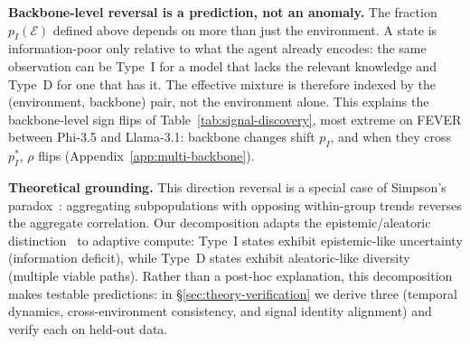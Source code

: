 \textbf{Backbone-level reversal is a prediction, not an anomaly.}
The fraction $p_I(\mathcal{E})$ defined above depends on more than just the environment. A state is information-poor only relative to what the agent already encodes: the same observation can be Type~I for a model that lacks the relevant knowledge and Type~D for one that has it. The effective mixture is therefore indexed by the (environment, backbone) pair, not the environment alone. This explains the backbone-level sign flips of Table~\ref{tab:signal-discovery}, most extreme on FEVER between Phi-3.5 and Llama-3.1: backbone changes shift $p_I$, and when they cross $p_I^*$, $\rho$ flips (Appendix~\ref{app:multi-backbone}).

\textbf{Theoretical grounding.}
This direction reversal is a special case of Simpson's paradox~\cite{simpson1951interpretation, DBLP:books/acm/22/Pearl22n}: aggregating subpopulations with opposing within-group trends reverses the aggregate correlation. Our decomposition adapts the epistemic/aleatoric distinction~\cite{der2009aleatory} to adaptive compute: Type~I states exhibit epistemic-like uncertainty (information deficit), while Type~D states exhibit aleatoric-like diversity (multiple viable paths). Rather than a post-hoc explanation, this decomposition makes testable predictions: in \S\ref{sec:theory-verification} we derive three (temporal dynamics, cross-environment consistency, and signal identity alignment) and verify each on held-out data.